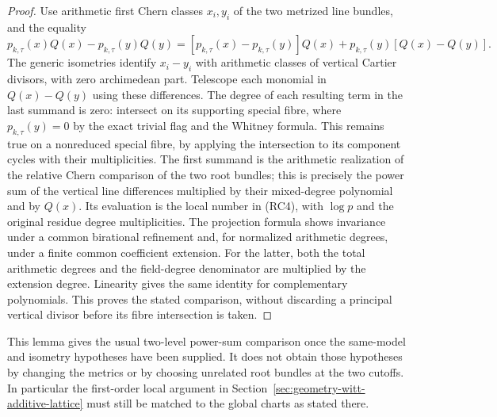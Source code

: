 \begin{proof}
Use arithmetic first Chern classes \(x_i,y_i\) of the two
metrized line bundles, and the equality
\[
 p_{k,\tau}(x)Q(x)-p_{k,\tau}(y)Q(y)
 = [p_{k,\tau}(x)-p_{k,\tau}(y)]Q(x)
   +p_{k,\tau}(y)[Q(x)-Q(y)] .
\]
The generic isometries identify \(x_i-y_i\) with arithmetic
classes of vertical Cartier divisors, with zero archimedean
part. Telescope each monomial in \(Q(x)-Q(y)\) using these
differences. The degree of each resulting term in the last
summand is zero: intersect on its supporting special fibre,
where \(p_{k,\tau}(y)=0\) by the exact trivial flag and the
Whitney formula. This remains true on a nonreduced special
fibre, by applying the intersection to its component cycles
with their multiplicities. The first summand is the arithmetic
realization of the relative Chern comparison of the two
root bundles; this is precisely the power sum of the vertical
line differences multiplied by their mixed-degree polynomial
and by \(Q(x)\). Its evaluation is the local number in (RC4),
with \(\log p\) and the original residue degree multiplicities.
The projection formula shows invariance under a common
birational refinement and, for normalized arithmetic degrees,
under a finite common coefficient extension. For the latter,
both the total arithmetic degrees and the field-degree
denominator are multiplied by the extension degree.
Linearity gives the same identity for complementary
polynomials. This proves the stated comparison, without
discarding a principal vertical divisor before its fibre
intersection is taken.
\end{proof}

This lemma gives the usual two-level power-sum comparison
once the same-model and isometry hypotheses have been supplied.
It does not obtain those hypotheses by changing the metrics
or by choosing unrelated root bundles at the two cutoffs.
In particular the first-order local argument in
Section~\ref{sec:geometry-witt-additive-lattice} must still
be matched to the global charts as stated there.

